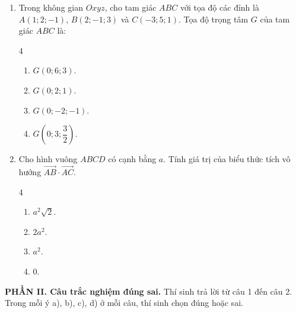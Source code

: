 \documentclass[12pt]{article}
\begin{document}
\begin{enumerate}[label=\textbf{Câu \arabic*.}, leftmargin=*]
		\item Trong không gian $Oxyz$, cho tam giác $ABC$ với tọa độ các đỉnh là $A(1; 2; -1)$, $B(2; -1; 3)$ và $C(-3; 5; 1)$. Tọa độ trọng tâm $G$ của tam giác $ABC$ là:
		\begin{multicols}{4}
			\begin{enumerate}[label=\Alph*.]
				\item $G(0; 6; 3)$.
				\item $G(0; 2; 1)$.
				\item $G(0; -2; -1)$.
				\item $G\left(0; 3; \dfrac{3}{2}\right)$.
			\end{enumerate}
		\end{multicols}
		
		\item Cho hình vuông $ABCD$ có cạnh bằng $a$. Tính giá trị của biểu thức tích vô hướng $\overrightarrow{AB} \cdot \overrightarrow{AC}$.
		\begin{multicols}{4}
			\begin{enumerate}[label=\Alph*.]
				\item $a^2\sqrt{2}$.
				\item $2a^2$.
				\item $a^2$.
				\item $0$.
			\end{enumerate}
		\end{multicols}
		
	\end{enumerate}
	
	\vspace{4mm}
	\noindent\textbf{PHẦN II. Câu trắc nghiệm đúng sai.} Thí sinh trả lời từ câu 1 đến câu 2. Trong mỗi ý a), b), c), d) ở mỗi câu, thí sinh chọn đúng hoặc sai.
	\vspace{2mm}
	
\end{document}
